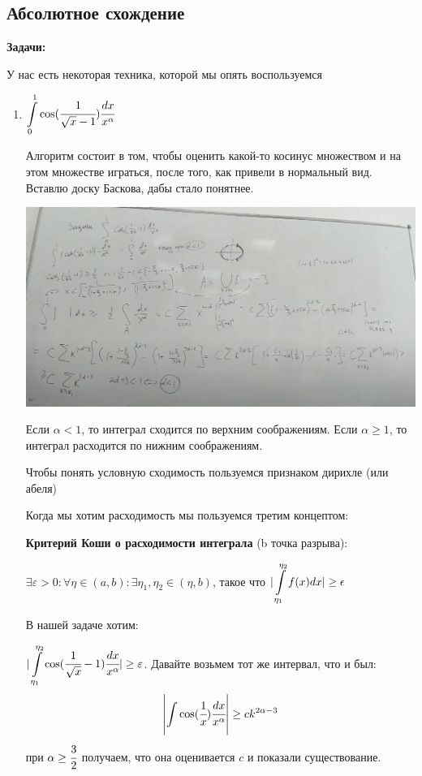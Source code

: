 \subsection{Абсолютное схождение}

\textbf{Задачи:}

У нас есть некоторая техника, которой мы опять воспользуемся

\begin{enumerate}
    \item $\displaystyle\int\limits_{0}^{1}\cos(\cfrac{1}{\sqrt{x}-1})\cfrac{dx}{x^{\alpha}}$

    Алгоритм состоит в том, чтобы оценить какой-то косинус множеством и на этом множестве играться, после того, как привели в нормальный вид. Вставлю доску Баскова, дабы стало понятнее.

    \begin{center}
        \includegraphics[width = 17cm]{assets/10_1.jpg}
    \end{center}



    Если $\alpha<1$, то интеграл сходится по верхним соображениям. Если $\alpha \geq 1$, то интеграл расходится по нижним соображениям.

    Чтобы понять условную сходимость пользуемся признаком дирихле (или абеля)

    Когда мы хотим  расходимость мы пользуемся третим концептом:

    \textbf{Критерий Коши о расходимости интеграла} (b точка разрыва):

    $\exists\varepsilon >0 : \forall \eta \in (a,b): \exists \eta_1, \eta_2 \in (\eta, b)$, такое что $|\displaystyle\int\limits_{\eta_{1}}^{\eta_{2}}f(x) dx| \geq \epsilon$

    В нашей задаче хотим:

    $|\displaystyle\int\limits_{\eta_1}^{\eta_2} \cos (\cfrac{1}{\sqrt{x}}-1)\cfrac{dx}{x^{\alpha}}|\geq \varepsilon$. Давайте возьмем тот же интервал, что и был:
    $$\left|\displaystyle\int\limits_{}^{} \cos (\cfrac{1}{x}) \cfrac{dx}{x^{\alpha}}  \right| \geq c k^{2\alpha -3}$$
    при $\alpha \geq \cfrac{3}{2}$ получаем, что она оценивается $c$ и показали существование.



\end{enumerate}

